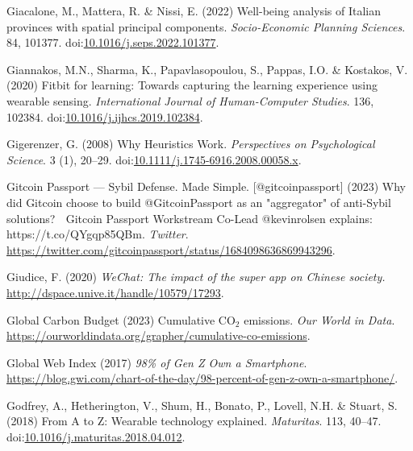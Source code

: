 \documentclass[
  letterpaper,
  DIV=11,
  numbers=noendperiod]{scrartcl}
\newlength{\cslhangindent}
\newenvironment{CSLReferences}[2] %
 {\begin{list}{}{%
  \setlength{\itemindent}{0pt}
  \setlength{\leftmargin}{0pt}
  \setlength{\parsep}{0pt}
  \ifodd #1
   \setlength{\leftmargin}{\cslhangindent}
   \setlength{\itemindent}{-1\cslhangindent}
  \fi
  \setlength{\itemsep}{#2\baselineskip}}}
 {\end{list}}
\begin{document}
\begin{CSLReferences}{0}{1}
Giacalone, M., Mattera, R. \& Nissi, E. (2022) Well-being analysis of
{Italian} provinces with spatial principal components.
\emph{Socio-Economic Planning Sciences}. 84, 101377.
doi:\href{https://doi.org/10.1016/j.seps.2022.101377}{10.1016/j.seps.2022.101377}.

Giannakos, M.N., Sharma, K., Papavlasopoulou, S., Pappas, I.O. \&
Kostakos, V. (2020) Fitbit for learning: {Towards} capturing the
learning experience using wearable sensing. \emph{International Journal
of Human-Computer Studies}. 136, 102384.
doi:\href{https://doi.org/10.1016/j.ijhcs.2019.102384}{10.1016/j.ijhcs.2019.102384}.

Gigerenzer, G. (2008) Why {Heuristics Work}. \emph{Perspectives on
Psychological Science}. 3 (1), 20--29.
doi:\href{https://doi.org/10.1111/j.1745-6916.2008.00058.x}{10.1111/j.1745-6916.2008.00058.x}.

Gitcoin Passport --- Sybil Defense. Made Simple. {[}@gitcoinpassport{]}
(2023) Why did {Gitcoin} choose to build @{GitcoinPassport} as an
"aggregator" of anti-{Sybil} solutions? 🤔 {Gitcoin Passport Workstream
Co-Lead} @kevinrolsen explains: {https://t.co/QYgqp85QBm}.
\emph{Twitter}.
\url{https://twitter.com/gitcoinpassport/status/1684098636869943296}.

Giudice, F. (2020) \emph{{WeChat}: The impact of the super app on
{Chinese} society.} \url{http://dspace.unive.it/handle/10579/17293}.

Global Carbon Budget (2023) Cumulative {CO}{\(_2\)} emissions. \emph{Our
World in Data}.
\url{https://ourworldindata.org/grapher/cumulative-co-emissions}.

Global Web Index (2017) \emph{98\% of {Gen Z Own} a {Smartphone}}.
\url{https://blog.gwi.com/chart-of-the-day/98-percent-of-gen-z-own-a-smartphone/}.

Godfrey, A., Hetherington, V., Shum, H., Bonato, P., Lovell, N.H. \&
Stuart, S. (2018) From {A} to {Z}: {Wearable} technology explained.
\emph{Maturitas}. 113, 40--47.
doi:\href{https://doi.org/10.1016/j.maturitas.2018.04.012}{10.1016/j.maturitas.2018.04.012}.


\end{CSLReferences}
\end{document}
